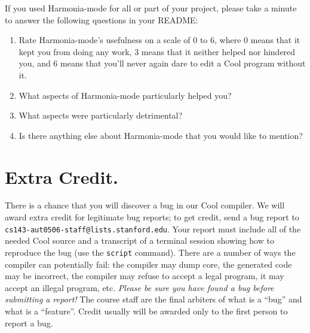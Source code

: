 \documentclass[11pt]{article}
\begin{document}

If you used Harmonia-mode for all or part of your project,
please take a minute to answer the following questions in your README:

\begin{enumerate}
\item Rate Harmonia-mode's usefulness on a scale of 0 to 6, where 0 
means
that it kept you from doing any work, 3 means that it neither helped
nor hindered you, and 6 means that you'll never again dare to edit a
Cool program without it.
\item What aspects of Harmonia-mode particularly helped you?
\item What aspects were particularly detrimental?
\item Is there anything else about Harmonia-mode that you would like
to mention?
\end{enumerate}



\section*{Extra Credit.} There is a chance that you will discover a bug in
our Cool compiler.  We will award extra credit for legitimate bug
reports; to get credit, send a bug report to {\tt cs143-aut0506-staff@lists.stanford.edu}.  Your
report must include all of the needed Cool source and a transcript of a
terminal session showing how to reproduce the bug (use the {\tt script}
command).  There are a number of ways the compiler can potentially fail:
the compiler may dump core, the generated code may be incorrect, the
compiler may refuse to accept a legal program, it may accept an illegal
program, etc.  {\em Please be sure you have found a bug before
submitting a report!} The course staff are the final arbiters of what is
a ``bug'' and what is a ``feature''.  Credit usually will be awarded
only to the first person to report a bug.
\end{document}
